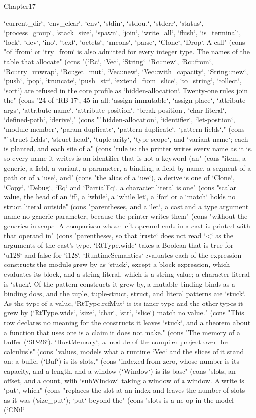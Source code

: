 \begin{lexlean}{Chapter17}
\begin{semanticmodule}
{{`current_dir`, `env_clear`, `env`, `stdin`, `stdout`, `stderr`, `status`, `process_group`, `stack_size`, `spawn`, `join`, `write_all`, `flush`, `is_terminal`, `lock`, `dev`, `ino`, `text`, `octets`, `uncons`, `parse`, `Clone`, `Drop`. A call" (cons "of `from` or `try_from` is also admitted for every integer type. The names of the table that allocate" (cons "(`Rc`, `Vec`, `String`, `Rc::new`, `Rc::from`, `Rc::try_unwrap`, `Rc::get_mut`, `Vec::new`, `Vec::with_capacity`, `String::new`, `push`, `pop`, `truncate`, `push_str`, `extend_from_slice`, `to_string`, `collect`, `sort`) are refused in the core profile as `hidden-allocation`. Twenty-one rules join the" (cons "24 of `RB-17`, 45 in all: `assign-immutable`, `assign-place`, `attribute-args`, `attribute-name`, `attribute-position`, `break-position`, `char-literal`, `defined-path`, `derive`," (cons "`hidden-allocation`, `identifier`, `let-position`, `module-member`, `param-duplicate`, `pattern-duplicate`, `pattern-fields`," (cons "`struct-fields`, `struct-head`, `tuple-arity`, `type-scope`, and `variant-name`; each is planted, and each site of a" (cons "rule is: the printer writes every name as it is, so every name it writes is an identifier that is not a keyword (an" (cons "item, a generic, a field, a variant, a parameter, a binding, a field by name, a segment of a path or of a `use`, and" (cons "the alias of a `use`), a derive is one of `Clone`, `Copy`, `Debug`, `Eq` and `PartialEq`, a character literal is one" (cons "scalar value, the head of an `if`, a `while`, a `while let`, a `for` or a `match` holds no struct literal outside" (cons "parentheses, and a `let`, a cast and a type argument name no generic parameter, because the printer writes them" (cons "without the generics in scope. A comparison whose left operand ends in a cast is printed with that operand in" (cons "parentheses, so that `rustc` does not read `<` as the arguments of the cast's type. `RtType.wide` takes a Boolean that is true for `u128` and false for `i128`. `RuntimeSemantics` evaluates each of the expression constructs the module grew by as `stuck`, except a block expression, which evaluates its block, and a string literal, which is a string value; a character literal is `stuck`. Of the pattern constructs it grew by, a mutable binding binds as a binding does, and the tuple, tuple-struct, struct, and literal patterns are `stuck`. As the type of a value, `RtType.refMut` is its inner type and the other types it grew by (`RtType.wide`, `size`, `char`, `str`, `slice`) match no value." (cons "This row declares no meaning for the constructs it leaves `stuck`, and a theorem about a function that uses one is a claim it does not make." (cons "The memory of a buffer (`SP-26`). `RustMemory`, a module of the compiler project over the calculus's" (cons "values, models what a runtime `Vec` and the slices of it stand on: a buffer (`Buf`) is its slots," (cons "indexed from zero, whose number is its capacity, and a length, and a window (`Window`) is its base" (cons "slots, an offset, and a count, with `subWindow` taking a window of a window. A write is `put`, which" (cons "replaces the slot at an index and leaves the number of slots as it was (`size_put`); `put` beyond the" (cons "slots is a no-op in the model (`CNil` }}
\end{semanticmodule}
\end{lexlean}
